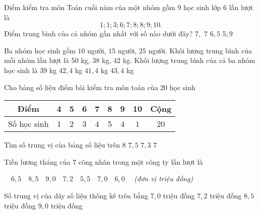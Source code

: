 \begin{ex}%
	Điểm kiểm tra môn Toán cuối năm của một nhóm gồm $9$ học sinh lớp $6$ lần lượt là
	$$1;1;3;6;7;8;8;9;10.$$
	Điểm trung bình của cả nhóm gần nhất với số nào dưới đây?
	\choice
	{$7{,}$}
	{$7$}
	{$6{,}5$}
	{\True $5{,}9$}
\end{ex}

\begin{ex}%
Ba nhóm học sinh gồm $10$ người, $15$ người, $25$ người. Khối lượng trung bình của mỗi nhóm lần lượt là $50$ kg, $38$ kg, $42$ kg. Khối lượng trung bình của cả ba nhóm học sinh là
\choice
{$39$ kg}
{\True $42{,}4$ kg}
{$41{,}4$ kg}
{$43{,}4$ kg}
\end{ex}

\begin{ex}%
Cho bảng số liệu điểm bài kiểm tra môn toán của $20$ học sinh
\begin{center}
	\begin{tabular}{|c|c|c|c|c|c|c|c|c|}
		\hline 
		Điểm	&4	&5	&6	&7	&8	&9 &10 &Cộng\\
		\hline 
		Số học sinh	&1	&2	&3	&4	&5	&4 &1 &20 \\
		\hline 
	\end{tabular}
\end{center}
Tìm số trung vị của bảng số liệu trên
\choice
{$8$}
{\True $7{,}5$}
{$7{,}3$}
{$7$}
\end{ex}

\begin{ex}%
Tiền lương tháng của $7$ công nhân trong một công ty lần lượt là
\begin{center}
$\quad 6{,}5 \quad 8{,}5 \quad 9{,}0 \quad 7{,}2 \quad 5{,}5 \quad 7{,}0 \quad 6{,}0 \quad$
\textit{(đơn vị triệu đồng)}
\end{center}
Số trung vị của dãy số liệu thống kê trên bằng
	\choice
	{\True $7{,}0$ triệu đồng}
	{$7{,}2$ triệu đồng}
	{$8{,}5$ triệu đồng}
	{$9{,}0$ triệu đồng}
\end{ex}

